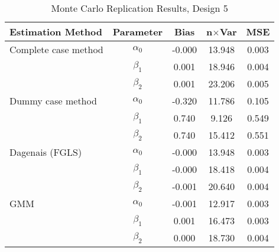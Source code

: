 \begin{table}
\centering
\caption{Monte Carlo Replication Results, Design 5}
\label{table:MCReplicationResultsDesign5}
\begin{tabular}{lcccc}
\toprule
Estimation Method & Parameter & Bias & n$\times$Var & MSE \\
\midrule
Complete case method & $\alpha_0$ & -0.000 & 13.948 & 0.003 \\
 & $\beta_1$ & 0.001 & 18.946 & 0.004 \\
 & $\beta_2$ & 0.001 & 23.206 & 0.005 \\
Dummy case method & $\alpha_0$ & -0.320 & 11.786 & 0.105 \\
 & $\beta_1$ & 0.740 & 9.126 & 0.549 \\
 & $\beta_2$ & 0.740 & 15.412 & 0.551 \\
Dagenais (FGLS) & $\alpha_0$ & -0.000 & 13.948 & 0.003 \\
 & $\beta_1$ & -0.000 & 18.418 & 0.004 \\
 & $\beta_2$ & -0.001 & 20.640 & 0.004 \\
GMM & $\alpha_0$ & -0.001 & 12.917 & 0.003 \\
 & $\beta_1$ & 0.001 & 16.473 & 0.003 \\
 & $\beta_2$ & 0.000 & 18.730 & 0.004 \\
\bottomrule
\end{tabular}
\end{table}
